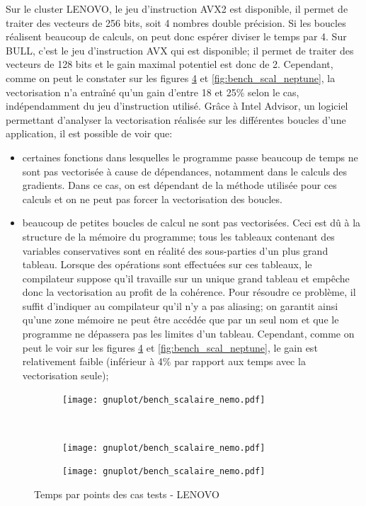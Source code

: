 Sur le cluster LENOVO, le jeu d'instruction AVX2 est disponible, il permet de traiter des vecteurs de 256 bits, soit 4 nombres double précision. Si les boucles réalisent beaucoup de calculs, on peut donc espérer diviser le temps par 4. Sur BULL, c'est le jeu d'instruction AVX qui est disponible; il permet de traiter des vecteurs de 128 bits et le gain maximal potentiel est donc de 2. Cependant, comme on peut le constater sur les figures \ref{fig:bench_scal_nemo} et \ref{fig:bench_scal_neptune}, la vectorisation n'a entraîné qu'un gain d'entre 18 et 25\% selon le cas, indépendamment du jeu d'instruction utilisé. Grâce à Intel Advisor, un logiciel permettant d'analyser la vectorisation réalisée sur les différentes boucles d'une application, il est possible de voir que:
\begin{itemize}
\item certaines fonctions dans lesquelles le programme passe beaucoup de temps ne sont pas vectorisée à cause de dépendances, notamment dans le calculs des gradients. Dans ce cas, on est dépendant de la méthode utilisée pour ces calculs et on ne peut pas forcer la vectorisation des boucles.
\item beaucoup de petites boucles de calcul ne sont pas vectorisées. Ceci est dû à la structure de la mémoire du programme; tous les tableaux contenant des variables conservatives sont en réalité des sous-parties d'un plus grand tableau. Lorsque des opérations sont effectuées sur ces tableaux, le compilateur suppose qu'il travaille sur un unique grand tableau et empêche donc la vectorisation au profit de la cohérence. Pour résoudre ce problème, il suffit d'indiquer au compilateur qu'il n'y a pas aliasing; on garantit ainsi qu'une zone mémoire ne peut être accédée que par un seul nom et que le programme ne dépassera pas les limites d'un tableau. Cependant, comme on peut le voir sur les figures \ref{fig:bench_scal_nemo} et \ref{fig:bench_scal_neptune}, le gain est relativement faible (inférieur à 4\% par rapport aux temps avec la vectorisation seule); 
\end{itemize}



\begin{figure}[!ht]
  \centering
  \begin{subfigure}[b]{0.5\textwidth}
    \centering
    \texttt{[image: gnuplot/bench\_scalaire\_nemo.pdf]}
  \caption{\label{fig:bench_scal_nemo_nonper}}
  \end{subfigure}%
  ~
  \begin{subfigure}[b]{0.5\textwidth}
    \centering
    \texttt{[image: gnuplot/bench\_scalaire\_nemo.pdf]}
  \caption{\label{fig:bench_scal_nemo_sym}}
  \end{subfigure}
  \begin{subfigure}[b]{0.5\textwidth}
    \centering
    \texttt{[image: gnuplot/bench\_scalaire\_nemo.pdf]}
  \caption{\label{fig:bench_scal_nemo_per}}
  \end{subfigure}
  \caption{\label{fig:bench_scal_nemo}Temps par points des cas tests - LENOVO}
\end{figure}



